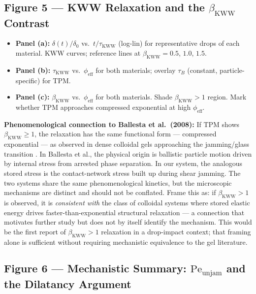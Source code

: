 \documentclass[11pt,letterpaper]{article}
\newcommand{\phieff}{\phi_{\mathrm{eff}}}
\newcommand{\taukww}{\tau_{\mathrm{KWW}}}
\newcommand{\taub}{\tau_{B}}
\newcommand{\peunj}{\mathrm{Pe}_{\mathrm{unjam}}}
\newcommand{\bkww}{\beta_{\mathrm{KWW}}}
\begin{document}
\subsection{Figure 5 --- KWW Relaxation and the $\bkww$ Contrast}

\begin{itemize}[noitemsep,topsep=3pt]
  \item \textbf{Panel (a):} $\delta(t)/\delta_0$ vs.\ $t/\taukww$ (log-lin)
    for representative drops of each material. KWW curves; reference lines
    at $\bkww = 0.5$, $1.0$, $1.5$.
  \item \textbf{Panel (b):} $\taukww$ vs.\ $\phieff$ for both materials;
    overlay $\taub$ (constant, particle-specific) for TPM.
  \item \textbf{Panel (c):} $\bkww$ vs.\ $\phieff$ for both materials.
    Shade $\bkww > 1$ region. Mark whether TPM approaches compressed
    exponential at high $\phieff$.
\end{itemize}

\begin{intuitionbox}
\textbf{Phenomenological connection to Ballesta et al.\ (2008):}
If TPM shows $\bkww \geq 1$, the relaxation has the same functional form ---
compressed exponential --- as observed in dense colloidal gels approaching the
jamming/glass transition \cite{Ballesta2008}. In Ballesta et al., the physical
origin is ballistic particle motion driven by internal stress from arrested phase
separation. In our system, the analogous stored stress is the contact-network
stress built up during shear jamming. The two systems share the same
phenomenological kinetics, but the microscopic mechanisms are distinct and should
not be conflated. Frame this as: if $\bkww > 1$ is observed, it is \emph{consistent
with} the class of colloidal systems where stored elastic energy drives
faster-than-exponential structural relaxation --- a connection that motivates
further study but does not by itself identify the mechanism. This would be the first
report of $\bkww > 1$ relaxation in a drop-impact context; that framing alone is
sufficient without requiring mechanistic equivalence to the gel literature.
\end{intuitionbox}

\subsection{Figure 6 --- Mechanistic Summary: $\peunj$ and the Dilatancy Argument}
\end{document}
